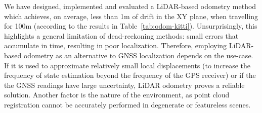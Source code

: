 \begin{compactenum}
    We have designed, implemented and evaluated a LiDAR-based odometry method which achieves, on average, less than 1m of drift in the XY plane, when travelling for 100m (according to the results in Table~\ref{tab:odom-kitti}). Unsurprisingly, this highlights a general limitation of dead-reckoning methods: small errors that accumulate in time, resulting in poor localization. Therefore, employing LiDAR-based odometry as an alternative to GNSS localization depends on the use-case. If it is used to approximate relatively small local displacements (\eg to increase the frequency of state estimation beyond the frequency of the GPS receiver) or if the the GNSS readings have large uncertainty, LiDAR odometry proves a reliable solution. Another factor is the nature of the environment, as point cloud registration cannot be accurately performed in degenerate or featureless scenes.

\end{compactenum}


